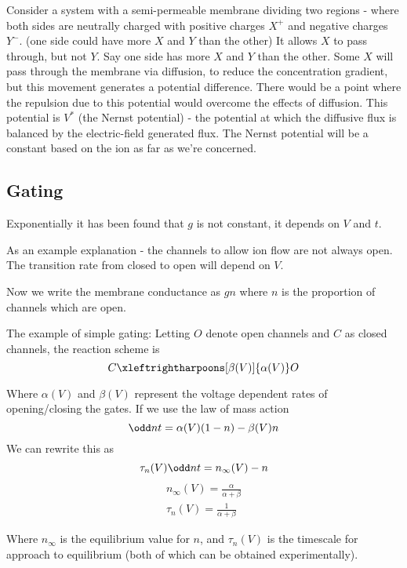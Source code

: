 \documentclass{X:/Documents/Coding/Latex/myassignment}
\begin{document}
Consider a system with a semi-permeable membrane dividing two regions - where both sides are neutrally charged with positive charges $X^+$ and negative charges $Y^-$. (one side could have more $X$ and $Y$ than the other) It allows $X$ to pass through, but not $Y$.
Say one side has more $X$ and $Y$ than the other. Some $X$ will pass through the membrane via diffusion, to reduce the concentration gradient, but this movement generates a potential difference. There would be a point where the repulsion due to this potential would overcome the effects of diffusion. This potential is $V^*$ (the Nernst potential) - the potential at which the diffusive flux is balanced by the electric-field generated flux.
The Nernst potential will be a constant based on the ion as far as we're concerned.

\subsection{Gating}
Exponentially it has been found that $g$ is not constant, it depends on $V$ and $t$.

As an example explanation - the channels to allow ion flow are not always open. 
The transition rate from closed to open will depend on $V$.

Now we write the membrane conductance as $gn$ where $n$ is the proportion of channels which are open. 

The example of simple gating:
Letting $O$ denote open channels and $C$ as closed channels, the reaction scheme is
\[C \xleftrightharpoons[\beta(V)]{\alpha(V)} O\]

Where $\alpha(V)$ and $\beta(V)$ represent the voltage dependent rates of opening/closing the gates. If we use the law of mass action
\[\odd nt = \alpha(V) (1-n) - \beta(V)n\]
We can rewrite this as 
\[\tau_n(V) \odd nt = n_{\infty}(V) - n\]
\begin{align*}
	n_{\infty}(V) = \frac{\alpha}{\alpha+\beta}\\
	\tau_n(V) = \frac{1}{\alpha+\beta}
\end{align*}

Where $n_\infty$ is the equilibrium value for $n$, and $\tau_n(V)$ is the timescale for approach to equilibrium (both of which can be obtained experimentally).
\end{document}
